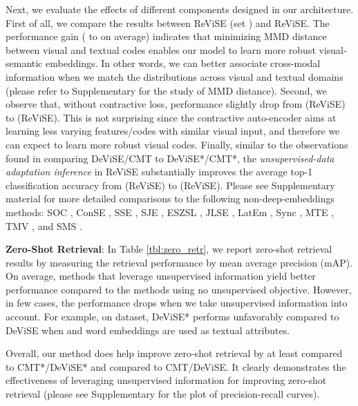 {{Next, we evaluate the effects of different components designed in our architecture. First of all, we compare the results between ReViSE (set ) and ReViSE. The performance gain ( to  on average) indicates that minimizing MMD distance between visual and textual codes enables our model to learn more robust visual-semantic embeddings. In other words, we can better associate cross-modal information when we match the distributions across visual and textual domains (please refer to Supplementary for the study of MMD distance). Second, we observe that, without contractive loss, performance slightly drop from  (ReViSE) to  (ReViSE). This is not surprising since the contractive auto-encoder aims at learning less varying features/codes with similar visual input, and therefore we can expect to learn more robust visual codes. 
Finally, similar to the observations found in comparing DeViSE/CMT to DeViSE*/CMT*, the {\em unsupervised-data adaptation inference} in ReViSE substantially improves the average top-1 classification 
accuracy from  (ReViSE) to  (ReViSE).
Please see Supplementary material for more detailed comparisons to the following non-deep-embeddings methods: SOC \cite{palatucci2009zero}, ConSE \cite{norouzi2013zero}, SSE \cite{zhang2015zero}, SJE \cite{akata2015evaluation}, ESZSL \cite{romera2015embarrassingly}, JLSE \cite{zhang2016zero1}, LatEm \cite{xian2016latent}, Sync \cite{changpinyo2016synthesized}, MTE \cite{bucher2016improving}, TMV \cite{fu2015transductive}, and SMS \cite{guo2016transductive}.




\vspace{0.1in}
\hspace{-5mm} {\bf Zero-Shot Retrieval}:
In Table \ref{tbl:zero_retr}, we report zero-shot retrieval results by measuring the retrieval performance by mean average precision (mAP). On average, methods that leverage unsupervised information yield better performance compared to the methods using no unsupervised objective. However, in few cases, the performance drops when we take unsupervised information into account. For example, on  dataset, DeViSE* performs unfavorably compared to DeViSE when  and  word embeddings are used as textual attributes. 

Overall, our method does help improve zero-shot retrieval by at least  compared to CMT*/DeViSE* and  compared to CMT/DeViSE. It clearly demonstrates the effectiveness of leveraging unsupervised information for improving zero-shot retrieval (please see Supplementary for the plot of precision-recall curves).

}}
